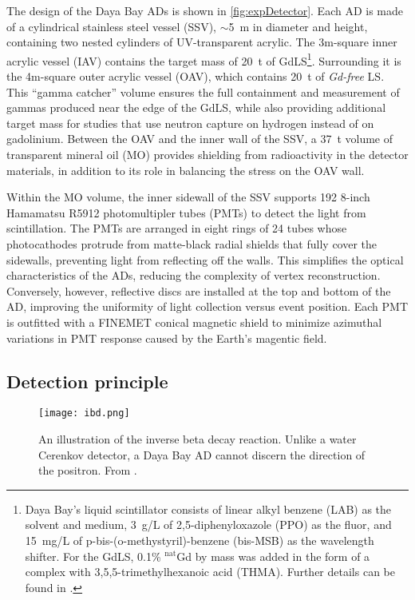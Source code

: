 \documentclass[../thesis.tex]{subfiles}
\begin{document}
The design of the Daya Bay ADs is shown in \autoref{fig:expDetector}. Each AD is made of a cylindrical stainless steel vessel (SSV), $\sim$5~m in diameter and height, containing two nested cylinders of UV-transparent acrylic. The 3m-square inner acrylic vessel (IAV) contains the target mass of 20~t of GdLS\footnote{Daya Bay's liquid scintillator consists of linear alkyl benzene (LAB) as the solvent and medium, 3~g/L of 2,5-diphenyloxazole (PPO) as the fluor, and 15~mg/L of p-bis-(o-methystyril)-benzene (bis-MSB) as the wavelength shifter. For the GdLS, 0.1\% $^{\text{nat}}$Gd by mass was added in the form of a complex with 3,5,5-trimethylhexanoic acid (THMA). Further details can be found in \cite{Beriguete_2014}.}. Surrounding it is the 4m-square outer acrylic vessel (OAV), which contains 20~t of \emph{Gd-free} LS. This ``gamma catcher'' volume ensures the full containment and measurement of gammas produced near the edge of the GdLS, while also providing additional target mass for studies that use neutron capture on hydrogen instead of on gadolinium. Between the OAV and the inner wall of the SSV, a 37~t volume of transparent mineral oil (MO) provides shielding from radioactivity in the detector materials, in addition to its role in balancing the stress on the OAV wall.

Within the MO volume, the inner sidewall of the SSV supports 192 8-inch Hamamatsu R5912 photomultipler tubes (PMTs) to detect the light from scintillation. The PMTs are arranged in eight rings of 24 tubes whose photocathodes protrude from matte-black radial shields that fully cover the sidewalls, preventing light from reflecting off the walls. This simplifies the optical characteristics of the ADs, reducing the complexity of vertex reconstruction. Conversely, however, reflective discs are installed at the top and bottom of the AD, improving the uniformity of light collection versus event position. Each PMT is outfitted with a FINEMET conical magnetic shield to minimize azimuthal variations in PMT response caused by the Earth's magentic field.

\subsection{Detection principle}
\label{sec:expDetPrinc}

\begin{figure}[ht]
  \texttt{[image: ibd.png]}
  \caption{An illustration of the inverse beta decay reaction. Unlike a water Cerenkov detector, a Daya Bay AD cannot discern the direction of the positron. From \cite{Fernandez_2017}.}
  \label{fig:expIBD}
\end{figure}
\end{document}
